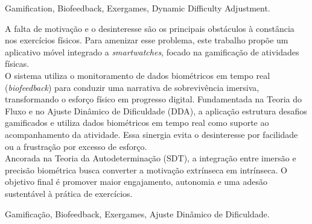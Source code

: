 \begin{abstract}
  Lack of motivation and disinterest are the main obstacles to consistency in physical exercise. To address this problem, this study proposes a mobile app integrated with smartwatches, focused on the gamification of physical activities. \\
  \indent The system uses real-time biometric data monitoring (biofeedback) to drive an immersive survival narrative, transforming physical effort into digital progress. Based on Flow Theory and Dynamic Difficulty Adjustment (DDA), the application structures gamified challenges and uses real-time biometric data to support activity monitoring. This synergy prevents disinterest due to ease or frustration due to excessive effort. \\
  \indent Anchored in Self-Determination Theory (SDT), the integration of immersion and biometric precision seeks to convert extrinsic motivation into intrinsic motivation. The ultimate goal is to promote greater engagement, autonomy, and sustainable adherence to exercise.
\end{abstract}

\begin{keywords}
Gamification, Biofeedback, Exergames, Dynamic Difficulty Adjustment.
\end{keywords}

\begin{resumo}
   A falta de motivação e o desinteresse são os principais obstáculos à constância nos exercícios físicos. Para amenizar esse problema, este trabalho propõe um aplicativo móvel integrado a \textit{smartwatches}, focado na gamificação de atividades físicas. \\
   \indent O sistema utiliza o monitoramento de dados biométricos em tempo real (\textit{biofeedback}) para conduzir uma narrativa de sobrevivência imersiva, transformando o esforço físico em progresso digital. Fundamentada na Teoria do Fluxo e no Ajuste Dinâmico de Dificuldade (DDA), a aplicação estrutura desafios gamificados e utiliza dados biométricos em tempo real como suporte ao acompanhamento da atividade. Essa sinergia evita o desinteresse por facilidade ou a frustração por excesso de esforço. \\
   \indent Ancorada na Teoria da Autodeterminação (SDT), a integração entre imersão e precisão biométrica busca converter a motivação extrínseca em intrínseca. O objetivo final é promover maior engajamento, autonomia e uma adesão sustentável à prática de exercícios. 
\end{resumo}

\begin{palavrasChaves}
Gamificação, Biofeedback, Exergames, Ajuste Dinâmico de Dificuldade.
\end{palavrasChaves}

